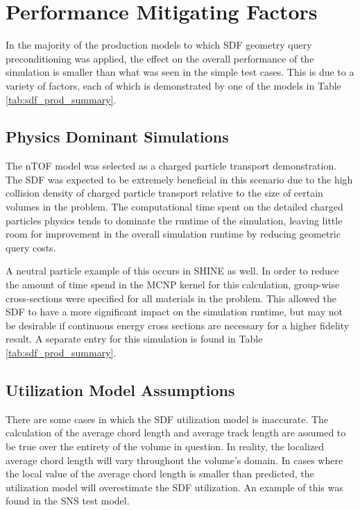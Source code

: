 \section{Performance Mitigating Factors}\label{sec:sdf_limitations}

In the majority of the production models to which SDF geometry query
preconditioning was applied, the effect on the overall performance of the
simulation is smaller than what was seen in the simple test cases. This is
due to a variety of factors, each of which is demonstrated by one of the models
in Table \ref{tab:sdf_prod_summary}.

\subsection{Physics Dominant Simulations}\label{subsec:sdf_phys_dominant}

The nTOF model was selected as a charged particle transport demonstration. The
SDF was expected to be extremely beneficial in this scenario due to the high
collision density of charged particle transport relative to the size of certain
volumes in the problem. The computational time spent on the detailed
charged particles physics tends to dominate the runtime of the simulation,
leaving little room for improvement in the overall simulation runtime by
reducing geometric query costs.

A neutral particle example of this occurs in SHINE as well. In order to reduce
the amount of time spend in the MCNP kernel for this calculation, group-wise
cross-sections were specified for all materials in the problem. This allowed the
SDF to have a more significant impact on the simulation runtime, but may not be
desirable if continuous energy cross sections are necessary for a higher
fidelity result. A separate entry for this simulation is found in Table
\ref{tab:sdf_prod_summary}.

\subsection{Utilization Model Assumptions}\label{subsec:sdf_util_model_limits}

There are some cases in which the SDF utilization model is inaccurate. The
calculation of the average chord length and average track length are assumed to
be true over the entirety of the volume in question. In reality, the localized
average chord length will vary throughout the volume's domain. In cases where
the local value of the average chord length is smaller than predicted, the
utilization model will overestimate the SDF utilization. An example of this was
found in the SNS test model.

